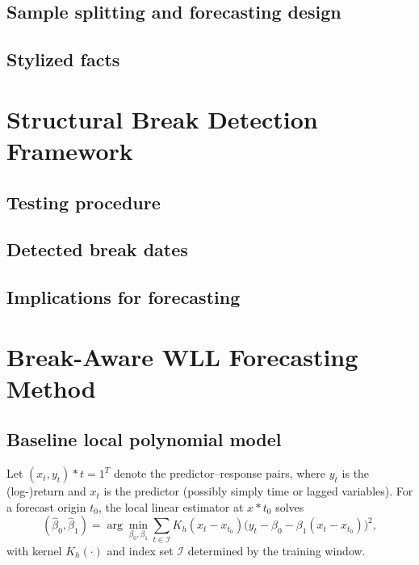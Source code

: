 \documentclass[11pt]{article}
\newcommand{\1}{\mathbf{1}}
\begin{document}
\subsection{Sample splitting and forecasting design}

\subsection{Stylized facts}

\section{Structural Break Detection Framework}
\label{sec:breaks}

\subsection{Testing procedure}

\subsection{Detected break dates}

\subsection{Implications for forecasting}

\section{Break-Aware WLL Forecasting Method}
\label{sec:wll-method}

\subsection{Baseline local polynomial model}

Let ${(x_t,y_t)}*{t=1}^T$ denote the predictor--response pairs, where $y_t$ is the (log-)return and $x_t$ is the predictor (possibly simply time or lagged variables). For a forecast origin $t_0$, the local linear estimator at $x*{t_0}$ solves
\begin{equation}
(\hat\beta_0,\hat\beta_1)
= \arg\min_{\beta_0,\beta_1} \sum_{t \in \mathcal{I}} K_h(x_t - x_{t_0})\big(y_t - \beta_0 - \beta_1(x_t - x_{t_0})\big)^2,
\end{equation}
with kernel $K_h(\cdot)$ and index set $\mathcal{I}$ determined by the training window.
\end{document}

